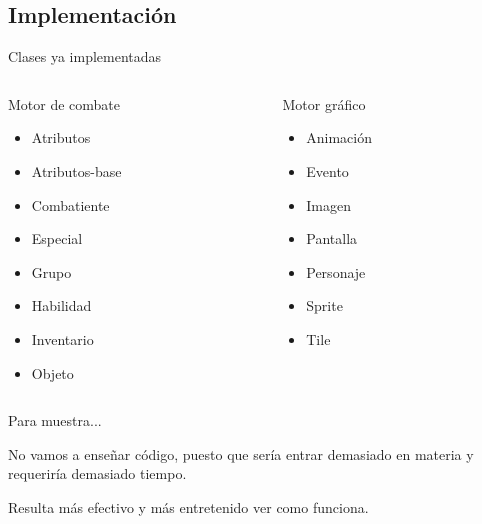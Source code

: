 \documentclass[9pt,xcolor=svgnames]{beamer}
\begin{document}
    
  \subsection{Implementación}
  
  \begin{frame}{Clases ya implementadas}
   
    \begin{columns}
     
     \begin{column}{3cm}
      \begin{block}{Motor de combate}
       \begin{itemize}
	\item Atributos
	\item Atributos-base
	\item Combatiente
	\item Especial
	\item Grupo
	\item Habilidad
	\item Inventario
	\item Objeto      
       \end{itemize}
      \end{block}
     \end{column}
     
     \begin{column}{3cm}
      \begin{block}{Motor gráfico}
       \begin{itemize}
	\item Animación
	\item Evento
	\item Imagen
	\item Pantalla
	\item Personaje
	\item Sprite
	\item Tile
       \end{itemize}
      \end{block}
     \end{column}
     
    \end{columns}
  \end{frame}
  
  \begin{frame}{Para muestra...}
   
   No vamos a enseñar código, puesto que sería entrar demasiado en
   materia y requeriría demasiado tiempo.\\ 
   \vspace*{0.5cm}
   
   Resulta más efectivo y más entretenido ver como funciona.
   
  \end{frame}
  
\end{document}
